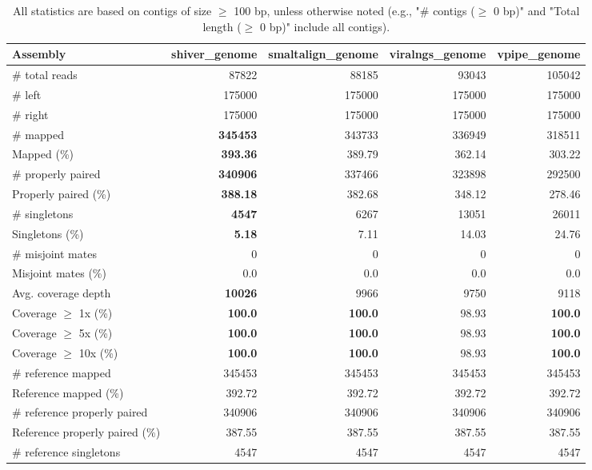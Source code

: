 \documentclass[12pt,a4paper]{article}
\begin{document}
\begin{table}[ht]
\begin{center}
\caption{All statistics are based on contigs of size $\geq$ 100 bp, unless otherwise noted (e.g., "\# contigs ($\geq$ 0 bp)" and "Total length ($\geq$ 0 bp)" include all contigs).}
\begin{tabular}{|l*{4}{|r}|}
\hline
Assembly & shiver\_genome & smaltalign\_genome & viralngs\_genome & vpipe\_genome \\ \hline
\# total reads & 87822 & 88185 & 93043 & 105042 \\ \hline
\# left & 175000 & 175000 & 175000 & 175000 \\ \hline
\# right & 175000 & 175000 & 175000 & 175000 \\ \hline
\# mapped & {\bf 345453} & 343733 & 336949 & 318511 \\ \hline
Mapped (\%) & {\bf 393.36} & 389.79 & 362.14 & 303.22 \\ \hline
\# properly paired & {\bf 340906} & 337466 & 323898 & 292500 \\ \hline
Properly paired (\%) & {\bf 388.18} & 382.68 & 348.12 & 278.46 \\ \hline
\# singletons & {\bf 4547} & 6267 & 13051 & 26011 \\ \hline
Singletons (\%) & {\bf 5.18} & 7.11 & 14.03 & 24.76 \\ \hline
\# misjoint mates & 0 & 0 & 0 & 0 \\ \hline
Misjoint mates (\%) & 0.0 & 0.0 & 0.0 & 0.0 \\ \hline
Avg. coverage depth & {\bf 10026} & 9966 & 9750 & 9118 \\ \hline
Coverage $\geq$ 1x (\%) & {\bf 100.0} & {\bf 100.0} & 98.93 & {\bf 100.0} \\ \hline
Coverage $\geq$ 5x (\%) & {\bf 100.0} & {\bf 100.0} & 98.93 & {\bf 100.0} \\ \hline
Coverage $\geq$ 10x (\%) & {\bf 100.0} & {\bf 100.0} & 98.93 & {\bf 100.0} \\ \hline
\# reference mapped & 345453 & 345453 & 345453 & 345453 \\ \hline
Reference mapped (\%) & 392.72 & 392.72 & 392.72 & 392.72 \\ \hline
\# reference properly paired & 340906 & 340906 & 340906 & 340906 \\ \hline
Reference properly paired (\%) & 387.55 & 387.55 & 387.55 & 387.55 \\ \hline
\# reference singletons & 4547 & 4547 & 4547 & 4547 \\ \hline

\end{tabular}
\end{center}
\end{table}
\end{document}
